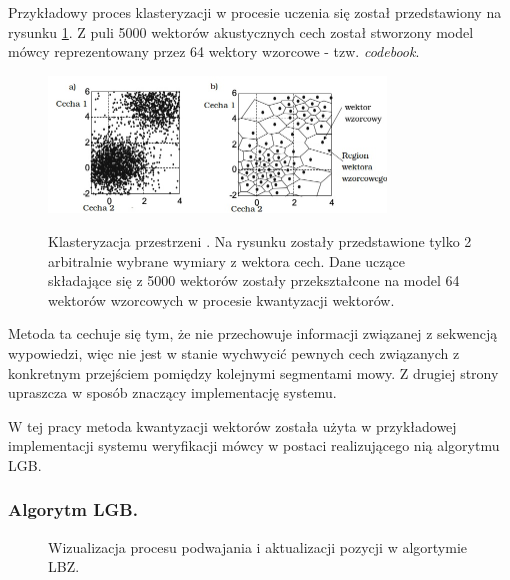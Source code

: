 Przykładowy proces klasteryzacji w procesie uczenia się został przedstawiony na rysunku \ref{VQjpg}. Z puli 5000 wektorów akustycznych cech został stworzony model mówcy reprezentowany przez 64 wektory wzorcowe - tzw. \textit{codebook}.

\begin{figure}[ht!]
  \centering
    \includegraphics[width=0.8\textwidth]{overwiewVQ.jpg}
    \label{VQjpg}
    \caption{Klasteryzacja przestrzeni \cite{overview}. Na rysunku zostały przedstawione tylko 2 arbitralnie wybrane wymiary z wektora cech. Dane uczące składające się z 5000 wektorów zostały przekształcone na model 64 wektorów wzorcowych w procesie kwantyzacji wektorów.}
\end{figure}

Metoda ta cechuje się tym, że nie przechowuje informacji związanej z sekwencją wypowiedzi, więc nie jest w stanie wychwycić pewnych cech związanych z konkretnym przejściem pomiędzy kolejnymi segmentami mowy. Z drugiej strony upraszcza w sposób znaczący implementację systemu.


W tej pracy metoda kwantyzacji wektorów została użyta w przykładowej implementacji systemu weryfikacji mówcy w postaci realizującego nią algorytmu LGB.

\subsubsection{Algorytm LGB.}
\label{lgb}

\begin{figure}
  \centering
    
    \caption{\label{lgbvis} Wizualizacja procesu podwajania i aktualizacji pozycji w algortymie LBZ.}
\end{figure}


